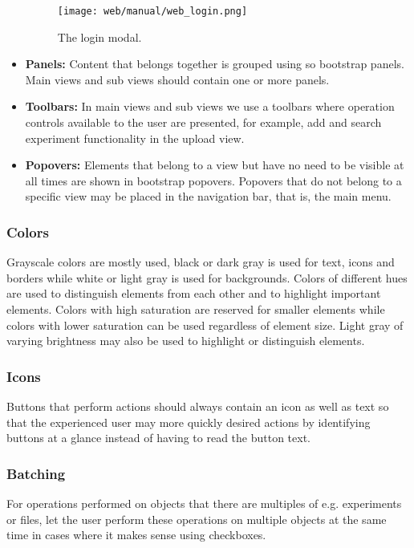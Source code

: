 \begin{itemize}
\begin{figure}
\centering
\texttt{[image: web/manual/web\_login.png]}
\caption{The login modal.}
\label{fig:web_search_login1}
\end{figure}

    \item \textbf{Panels:}
Content that belongs together is grouped using so bootstrap panels. Main views and sub views should contain one or more panels.
    
    \item \textbf{Toolbars:}
In main views and sub views we use a toolbars where operation controls available to the user are presented, for example, add and search experiment functionality in the upload view.
    
    \item \textbf{Popovers:}
Elements that belong to a view but have no need to be visible at all times are shown in bootstrap popovers. Popovers that do not belong to a specific view may be placed in the navigation bar, that is, the main menu.
\end{itemize}

\subsubsection{Colors}
Grayscale colors are mostly used, black or dark gray is used for text, icons and borders while white or light gray is used for backgrounds. Colors of different hues are used to distinguish elements from each other and to highlight important elements. Colors with high saturation are reserved for smaller elements while colors with lower saturation can be used regardless of element size. Light gray of varying brightness may also be used to highlight or distinguish elements.

\subsubsection{Icons}
Buttons that perform actions should always contain an icon as well as text so that the experienced user may more quickly desired actions by identifying buttons at a glance instead of having to read the button text. 

\subsubsection{Batching}
For operations performed on objects that there are multiples of e.g. experiments or files, let the user perform these operations on multiple objects at the same time in cases where it makes sense using checkboxes.
